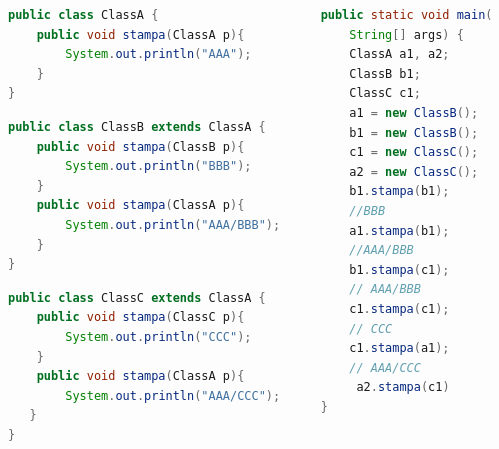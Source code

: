 \documentclass{beamer}
\begin{document}
\begin{frame}[fragile]
\begin{columns}
\begin{column}{0.6\textwidth}
\begin{lstlisting}[language=Java,escapechar=|]
public class ClassA {
    public void stampa(ClassA p){
        System.out.println("AAA");
    }
}
\end{lstlisting}
\begin{lstlisting}[language=Java,escapechar=|]
public class ClassB extends ClassA {
    public void stampa(ClassB p){
        System.out.println("BBB");
    }
    public void stampa(ClassA p){
        System.out.println("AAA/BBB");
    }
}
\end{lstlisting}
\begin{lstlisting}[language=Java,escapechar=|]
public class ClassC extends ClassA {
    public void stampa(ClassC p){
        System.out.println("CCC");
    }
    public void stampa(ClassA p){
        System.out.println("AAA/CCC");
   }
}
\end{lstlisting}
\end{column}
\begin{column}{0.4\textwidth}
\begin{lstlisting}[language=Java,escapechar=|]
public static void main(
    String[] args) {
    ClassA a1, a2;
    ClassB b1;
    ClassC c1;
    a1 = new ClassB();
    b1 = new ClassB();
    c1 = new ClassC();
    a2 = new ClassC();
    b1.stampa(b1); 
    //BBB
    a1.stampa(b1);  
    //AAA/BBB
    b1.stampa(c1); 
    // AAA/BBB
    c1.stampa(c1); 
    // CCC
    c1.stampa(a1); 
    // AAA/CCC
     a2.stampa(c1)
}
\end{lstlisting}
\end{column}
\end{columns}
\end{frame}
\end{document}
